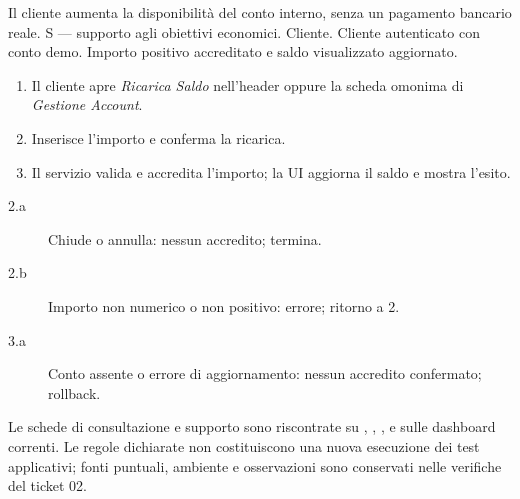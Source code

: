 \clearpage
{}
{Il cliente aumenta la disponibilit\`a del conto interno, senza un pagamento bancario reale.}
{S --- supporto agli obiettivi economici.}
{Cliente.}
{Cliente autenticato con conto demo.}
{Importo positivo accreditato e saldo visualizzato aggiornato.}
\principale
\begin{enumerate}
\item Il cliente apre \emph{Ricarica Saldo} nell'header oppure la scheda
  omonima di \emph{Gestione Account}.
\item Inserisce l'importo e conferma la ricarica.
\item Il servizio valida e accredita l'importo; la UI aggiorna il saldo e mostra l'esito.
\end{enumerate}
\alternative
\begin{description}
\item[2.a] Chiude o annulla: nessun accredito; termina.
\item[2.b] Importo non numerico o non positivo: errore; ritorno a 2.
\item[3.a] Conto assente o errore di aggiornamento: nessun accredito confermato; rollback.
\end{description}
\begin{flushleft}Le schede di consultazione e supporto sono riscontrate su
, , ,
 e sulle dashboard correnti. Le regole dichiarate
non costituiscono una nuova esecuzione dei test applicativi; fonti puntuali,
ambiente e osservazioni sono conservati nelle verifiche del ticket 02.\end{flushleft}
